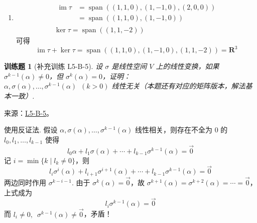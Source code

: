 \documentclass[12pt,fontset=fandol]{ctexart}
\newtheorem{exercise}{训练题}[section]
\begin{document}
\begin{solve}
\begin{enumerate}
                \item \begin{gather*}
                          \begin{aligned}
                              \operatorname{im} \tau & = \operatorname{span}((1, 1, 0), (1, -1, 0), (2, 0, 0)) \\
                                       & = \operatorname{span}((1, 1, 0), (1, -1, 0))
                          \end{aligned} \\
                          \ker \tau = \operatorname{span}((1, 1, -2))
                      \end{gather*}
                      可得
                      \[ \operatorname{im} \tau + \ker \tau = \operatorname{span}((1, 1, 0), (1, -1, 0), (1, 1, -2)) = \mathbf{R}^3 \]
            \end{enumerate}
\end{solve}

\begin{exercise}[补充训练 L5-B-5]\label{prob:L5-B-5}
设 $\sigma$ 是线性空间 $V$ 上的线性变换，如果 $\sigma^{k-1}(\alpha) \neq 0$，但 $\sigma^{k}(\alpha) = 0$，证明：\\
        $\alpha,\sigma(\alpha),\ldots,\sigma^{k-1}(\alpha)\enspace(k>0)$ 线性无关（本题还有对应的矩阵版本，解法基本一致）.
\end{exercise}
\noindent 来源：\href{https://github.com/yhwu-is/Linear-Algebra-Left-Undone/blob/new/%E8%AE%B2%E4%B9%89/%E4%B8%93%E9%A2%98/5%20%E7%BA%BF%E6%80%A7%E6%98%A0%E5%B0%84.tex}{L5-B-5}。
\begin{solve}
使用反证法. 假设 $ \alpha, \sigma(\alpha), \ldots, \sigma^{k - 1}(\alpha) $ 线性相关，则存在不全为 0 的 $ l_0, l_1, \ldots, l_{k - 1} $ 使得
          \[ l_0 \alpha + l_1 \sigma(\alpha) + \cdots + l_{k - 1} \sigma^{k - 1}(\alpha) = \vec{0} \]
          记 $ i = \min\{k \mid l_k \neq 0\} $，则
          \[ l_i \sigma^{i}(\alpha) + l_{i + 1} \sigma^{i + 1}(\alpha) + \cdots + l_{k - 1} \sigma^{k - 1}(\alpha) = \vec{0} \]
          两边同时作用 $ \sigma^{k - i - 1} $. 由于 $ \sigma^{k}(\alpha) = \vec{0} $，故 $ \sigma^{k + 1}(\alpha) = \sigma^{k + 2}(\alpha) = \cdots = \vec{0} $，上式成为
          \[ l_i \sigma^{k - 1}(\alpha) = \vec{0} \]
          而 $ l_i \neq 0,\enspace \sigma^{k - 1}(\alpha) \neq \vec{0} $，矛盾！
\end{solve}
\end{document}
